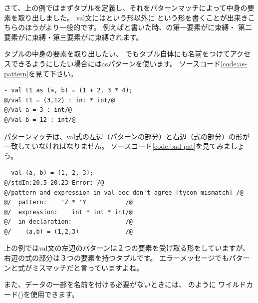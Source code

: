 \documentclass[11pt,a4paper]{jarticle}
\begin{document}
さて、上の例ではまずタプルを定義し、それをパターンマッチによって中身の要素を取り出しました。
val文にはという形以外に
という形を書くことが出来きこちらのほうがより一般的です。
例えばと書いた時、の第一要素がに束縛・
第二要素がに束縛・第三要素がに束縛されます。

タプルの中身の要素を取り出したい、
でもタプル自体にも名前をつけてアクセスできるようにしたい場合にはasパターンを使います。
ソースコード\ref{code:as-pattern}を見て下さい。

\begin{lstlisting}[caption=asパターン,label=code:as-pattern]
- val t1 as (a, b) = (1 + 2, 3 * 4);
@/val t1 = (3,12) : int * int/@
@/val a = 3 : int/@
@/val b = 12 : int/@
\end{lstlisting}

パターンマッチは、val式の左辺（パターンの部分）と右辺（式の部分）の形が一致していなければなりません。
ソースコード\ref{code:bad-pat}を見てみましょう。
\begin{lstlisting}[caption=型が合わないパターンマッチ,label=code:bad-pat]
- val (a, b) = (1, 2, 3);
@/stdIn:20.5-20.23 Error: /@
@/pattern and expression in val dec don't agree [tycon mismatch] /@
@/  pattern:    'Z * 'Y           /@
@/  expression:    int * int * int/@
@/  in declaration:               /@
@/    (a,b) = (1,2,3)             /@
\end{lstlisting}

上の例ではval文の左辺のパターンは２つの要素を受け取る形をしていますが、
右辺の式の部分は３つの要素を持つタプルです。
エラーメッセージでもパターンと式がミスマッチだと言っていますよね。

また、データの一部を名前を付ける必要がないときには、
のように
ワイルドカード(\prog{_})を使用できます。
\end{document}
